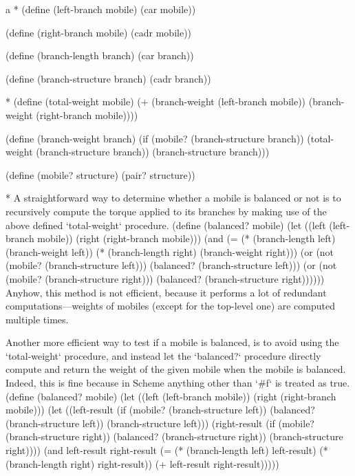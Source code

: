\begitems\style a
* \removettskip\begtt\scm
(define (left-branch mobile)
  (car mobile))

(define (right-branch mobile)
  (cadr mobile))

(define (branch-length branch)
  (car branch))

(define (branch-structure branch)
  (cadr branch))
\endtt

* \removettskip\begtt\scm
(define (total-weight mobile)
  (+ (branch-weight (left-branch mobile))
     (branch-weight (right-branch mobile))))

(define (branch-weight branch)
  (if (mobile? (branch-structure branch))
      (total-weight (branch-structure branch))
      (branch-structure branch)))

(define (mobile? structure)
  (pair? structure))
\endtt

* A straightforward way to determine whether a mobile is balanced or not is to recursively compute the torque applied to its branches by making use of the above defined `total-weight` procedure. 
\begtt\scm
(define (balanced? mobile)
  (let ((left (left-branch mobile))
        (right (right-branch mobile)))
    (and (= (* (branch-length left) (branch-weight left))
            (* (branch-length right) (branch-weight right)))
          (or (not (mobile? (branch-structure left)))
              (balanced? (branch-structure left)))
          (or (not (mobile? (branch-structure right)))
              (balanced? (branch-structure right))))))
\endtt
Anyhow, this method is not efficient, because it performs a lot of redundant computations---weights of mobiles (except for the top-level one) are computed multiple times.

Another more efficient way to test if a mobile is balanced, is to avoid using the `total-weight` procedure, and instead let the `balanced?` procedure directly compute and return the weight of the given mobile when the mobile is balanced.  Indeed, this is fine because in Scheme anything other than `#f` is treated as true.
\begtt\scm
(define (balanced? mobile)
  (let ((left (left-branch mobile))
        (right (right-branch mobile)))
    (let ((left-result (if (mobile? (branch-structure left))
                           (balanced? (branch-structure left))
                           (branch-structure left)))
          (right-result (if (mobile? (branch-structure right))
                            (balanced? (branch-structure right))
                            (branch-structure right))))
      (and left-result
           right-result
           (= (* (branch-length left) left-result)
              (* (branch-length right) right-result))
           (+ left-result right-result)))))
\endtt

